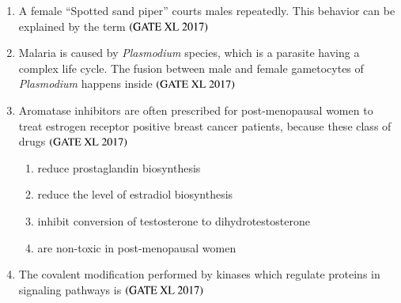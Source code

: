 \documentclass[journal]{IEEEtran}
\begin{document}
\begin{enumerate}
\item A female ``Spotted sand piper'' courts males repeatedly. This behavior can be explained by the term \hfill $\left(\text{GATE XL 2017}\right)$
\begin{enumerate}
\end{enumerate}

\item Malaria is caused by \textit{Plasmodium} species, which is a parasite having a complex life cycle. The fusion between male and female gametocytes of \textit{Plasmodium} happens inside \hfill $\left(\text{GATE XL 2017}\right)$
\begin{enumerate}
\end{enumerate}

\item Aromatase inhibitors are often prescribed for post-menopausal women to treat estrogen receptor positive breast cancer patients, because these class of drugs \hfill $\left(\text{GATE XL 2017}\right)$
\begin{enumerate}
    \item reduce prostaglandin biosynthesis
    \item reduce the level of estradiol biosynthesis
    \item inhibit conversion of testosterone to dihydrotestosterone
    \item are non-toxic in post-menopausal women
\end{enumerate}

\item The covalent modification performed by kinases which regulate proteins in signaling pathways is \hfill $\left(\text{GATE XL 2017}\right)$
\begin{enumerate}
\end{enumerate}


\end{enumerate}
\end{document}
